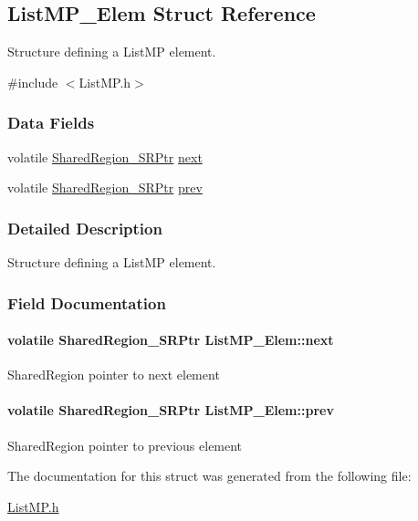 \subsection{ListMP\_\-Elem Struct Reference}
\label{struct_list_m_p___elem}


Structure defining a ListMP element.  




{\ttfamily \#include $<$ListMP.h$>$}

\subsubsection*{Data Fields}
\begin{DoxyCompactItemize}
\item 
volatile \hyperlink{_shared_region_8h_a3efe06da0fa1fcbb3b271278ddd9b410}{SharedRegion\_\-SRPtr} \hyperlink{struct_list_m_p___elem_a8412a4ab0e165caa517a2b6b36ee718a}{next}
\item 
volatile \hyperlink{_shared_region_8h_a3efe06da0fa1fcbb3b271278ddd9b410}{SharedRegion\_\-SRPtr} \hyperlink{struct_list_m_p___elem_af77ecd85f8df18db6bfcbbd55dcc99ab}{prev}
\end{DoxyCompactItemize}


\subsubsection{Detailed Description}
Structure defining a ListMP element. 

\subsubsection{Field Documentation}
\paragraph[{next}]{\setlength{\rightskip}{0pt plus 5cm}volatile {\bf SharedRegion\_\-SRPtr} {\bf ListMP\_\-Elem::next}}\hfill\label{struct_list_m_p___elem_a8412a4ab0e165caa517a2b6b36ee718a}
SharedRegion pointer to next element 
\paragraph[{prev}]{\setlength{\rightskip}{0pt plus 5cm}volatile {\bf SharedRegion\_\-SRPtr} {\bf ListMP\_\-Elem::prev}}\hfill\label{struct_list_m_p___elem_af77ecd85f8df18db6bfcbbd55dcc99ab}
SharedRegion pointer to previous element 

The documentation for this struct was generated from the following file:\begin{DoxyCompactItemize}
\item 
\hyperlink{_list_m_p_8h}{ListMP.h}\end{DoxyCompactItemize}
